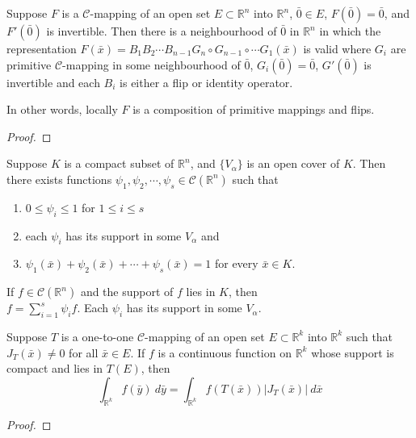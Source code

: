 \begin{theorem}
	Suppose $F$ is a $\mathscr{C}$-mapping of an open set $E \subset \mathbb{R}^n$ into $\mathbb{R}^n$, $\bar{0} \in E$, $F(\bar{0}) = \bar{0}$, and $F'(\bar{0})$ is invertible.
	Then there is a neighbourhood of $\bar{0}$ in $\mathbb{R}^n$ in which the representation $F(\bar{x}) = B_1B_2\cdots B_{n-1}G_n\circ G_{n-1}\circ \cdots G_1(\bar{x})$ is valid where $G_i$ are primitive $\mathscr{C}$-mapping in some neighbourhood of $\bar{0}$, $G_i(\bar{0}) = \bar{0}$, $G'(\bar{0})$ is invertible and each $B_i$ is either a flip or identity operator.

\begin{commentary}
	In other words, locally $F$ is a composition of primitive mappings and flips.
\end{commentary}
\end{theorem}
\begin{proof}
\end{proof}

\begin{theorem}
	Suppose $K$ is a compact subset of $\mathbb{R}^n$, and $\{V_\alpha\}$ is an open cover of $K$.
	Then there exists functions $\psi_1,\psi_2,\cdots,\psi_s \in \mathscr{C}(\mathbb{R}^n)$ such that
	\begin{enumerate}
		\item $0 \le \psi_i \le 1$ for $1 \le i \le s$
		\item each $\psi_i$ has its support in some $V_\alpha$ and
		\item $\psi_1(\bar{x}) + \psi_2(\bar{x}) + \cdots + \psi_s(\bar{x}) = 1$ for every $\bar{x} \in K$.
	\end{enumerate}
\end{theorem}

\begin{corollary}
	If $f \in \mathscr{C}(\mathbb{R}^n)$ and the support of $f$ lies in $K$,
	then\\ $f = \sum\limits_{i=1}^s \psi_i f$. Each $\psi_i$ has its support in some $V_\alpha$.
\end{corollary}

\begin{theorem}
	Suppose $T$ is a one-to-one $\mathscr{C}$-mapping of an open set $E \subset \mathbb{R}^k$ into $\mathbb{R}^k$ such that $J_T(\bar{x}) \ne 0$ for all $\bar{x} \in E$.
	If $f$ is a continuous function on $\mathbb{R}^k$ whose support is compact and lies in $T(E)$, then
	\begin{equation}
		\int_{\mathbb{R}^k} f(\bar{y})\ d\bar{y} = \int_{\mathbb{R}^k} f(T(\bar{x}))|J_T(\bar{x})|\ d\bar{x}
	\end{equation}
\end{theorem}
\begin{proof}

\end{proof}

